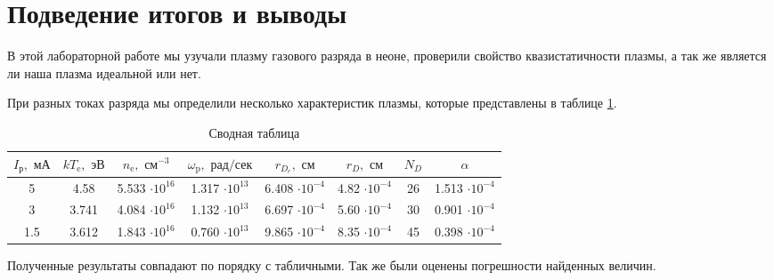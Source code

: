 \documentclass[a4paper,12pt]{article} %
\begin{document}
\section{Подведение итогов и выводы}

В этой лабораторной работе мы узучали плазму газового разряда в неоне, проверили свойство квазистатичности плазмы, а так же является ли наша плазма идеальной или нет. 

При разных токах разряда мы определили несколько характеристик плазмы, которые представлены в таблице \ref{tab12}.

    \begin{table}[h]
	\centering
	\begin{tabular}{|c|c|c|c|c|c|c|c|}
            \hline
            $I_{\text{р}}, \text{ мА}$ & $kT_{\text{e}}, \text{ эВ}$ & $n_{\text{e}}, \text{ см}^{-3}$ & $\omega_{\text{p}}, \text{ рад/сек}$ & $r_{D_e}, \text{ см}$ & $r_{D}, \text{ см}$ & $N_{D}$ & $\alpha$ \\ \hline
            5 & 4.58 & 5.533 $\cdot 10^{16}$ & 1.317 $\cdot 10^{13}$ & 6.408 $\cdot 10^{-4}$ & 4.82 $\cdot 10^{-4}$ & 26 & 1.513 $\cdot 10^{-4}$ \\ \hline
            3 & 3.741 & 4.084 $\cdot 10^{16}$ & 1.132 $\cdot 10^{13}$ & 6.697 $\cdot 10^{-4}$ & 5.60 $\cdot 10^{-4}$ & 30 & 0.901 $\cdot 10^{-4}$ \\ \hline
            1.5 & 3.612 & 1.843 $\cdot 10^{16}$ & 0.760 $\cdot 10^{13}$ & 9.865 $\cdot 10^{-4}$ & 8.35 $\cdot 10^{-4}$ & 45 & 0.398 $\cdot 10^{-4}$ \\ \hline
        \end{tabular}
	\caption{Сводная таблица}
	\label{tab12}
    \end{table}

    Полученные результаты совпадают по порядку с табличными. Так же были оценены погрешности найденных величин.
\end{document}

